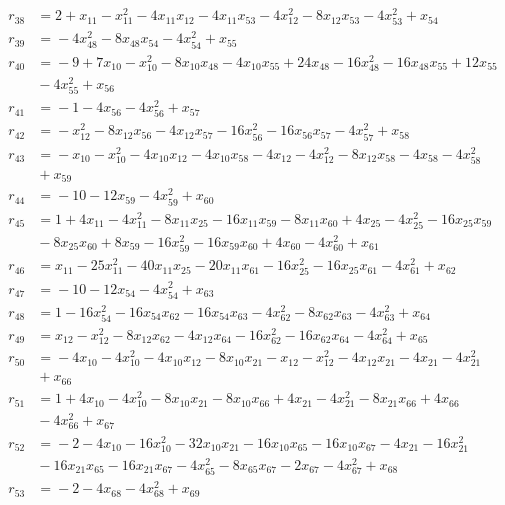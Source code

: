 \begin{align*}
r_{38} &={}2 +x_{11} -x_{11}^{2} -4x_{11}x_{12} -4x_{11}x_{53} -4x_{12}^{2} -8x_{12}x_{53} -4x_{53}^{2} +x_{54} \\
r_{39} &={}-4x_{48}^{2} -8x_{48}x_{54} -4x_{54}^{2} +x_{55} \\
r_{40} &={}-9 +7x_{10} -x_{10}^{2} -8x_{10}x_{48} -4x_{10}x_{55} +24x_{48} -16x_{48}^{2} -16x_{48}x_{55} +12x_{55} \\
&{}-4x_{55}^{2} +x_{56} \\
r_{41} &={}-1 -4x_{56} -4x_{56}^{2} +x_{57} \\
r_{42} &={}-x_{12}^{2} -8x_{12}x_{56} -4x_{12}x_{57} -16x_{56}^{2} -16x_{56}x_{57} -4x_{57}^{2} +x_{58} \\
r_{43} &={}-x_{10} -x_{10}^{2} -4x_{10}x_{12} -4x_{10}x_{58} -4x_{12} -4x_{12}^{2} -8x_{12}x_{58} -4x_{58} -4x_{58}^{2} \\
&{}+x_{59} \\
r_{44} &={}-10 -12x_{59} -4x_{59}^{2} +x_{60} \\
r_{45} &={}1 +4x_{11} -4x_{11}^{2} -8x_{11}x_{25} -16x_{11}x_{59} -8x_{11}x_{60} +4x_{25} -4x_{25}^{2} -16x_{25}x_{59} \\
&{}-8x_{25}x_{60} +8x_{59} -16x_{59}^{2} -16x_{59}x_{60} +4x_{60} -4x_{60}^{2} +x_{61} \\
r_{46} &={}x_{11} -25x_{11}^{2} -40x_{11}x_{25} -20x_{11}x_{61} -16x_{25}^{2} -16x_{25}x_{61} -4x_{61}^{2} +x_{62} \\
r_{47} &={}-10 -12x_{54} -4x_{54}^{2} +x_{63} \\
r_{48} &={}1 -16x_{54}^{2} -16x_{54}x_{62} -16x_{54}x_{63} -4x_{62}^{2} -8x_{62}x_{63} -4x_{63}^{2} +x_{64} \\
r_{49} &={}x_{12} -x_{12}^{2} -8x_{12}x_{62} -4x_{12}x_{64} -16x_{62}^{2} -16x_{62}x_{64} -4x_{64}^{2} +x_{65} \\
r_{50} &={}-4x_{10} -4x_{10}^{2} -4x_{10}x_{12} -8x_{10}x_{21} -x_{12} -x_{12}^{2} -4x_{12}x_{21} -4x_{21} -4x_{21}^{2} \\
&{}+x_{66} \\
r_{51} &={}1 +4x_{10} -4x_{10}^{2} -8x_{10}x_{21} -8x_{10}x_{66} +4x_{21} -4x_{21}^{2} -8x_{21}x_{66} +4x_{66} \\
&{}-4x_{66}^{2} +x_{67} \\
r_{52} &={}-2 -4x_{10} -16x_{10}^{2} -32x_{10}x_{21} -16x_{10}x_{65} -16x_{10}x_{67} -4x_{21} -16x_{21}^{2} \\
&{}-16x_{21}x_{65} -16x_{21}x_{67} -4x_{65}^{2} -8x_{65}x_{67} -2x_{67} -4x_{67}^{2} +x_{68} \\
r_{53} &={}-2 -4x_{68} -4x_{68}^{2} +x_{69} \\

\end{align*}
